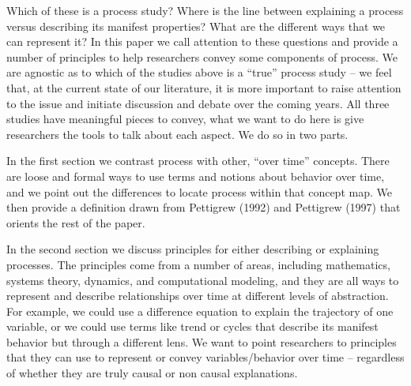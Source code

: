 \documentclass[english,,man]{apa6}
\theoremstyle{definition}
\theoremstyle{definition}
\theoremstyle{definition}
\theoremstyle{remark}
\begin{document}
Which of these is a process study? Where is the line between explaining
a process versus describing its manifest properties? What are the
different ways that we can represent it? In this paper we call attention
to these questions and provide a number of principles to help
researchers convey some components of process. We are agnostic as to
which of the studies above is a \enquote{true} process study -- we feel
that, at the current state of our literature, it is more important to
raise attention to the issue and initiate discussion and debate over the
coming years. All three studies have meaningful pieces to convey, what
we want to do here is give researchers the tools to talk about each
aspect. We do so in two parts.

In the first section we contrast process with other, \enquote{over time}
concepts. There are loose and formal ways to use terms and notions about
behavior over time, and we point out the differences to locate process
within that concept map. We then provide a definition drawn from
Pettigrew (1992) and Pettigrew (1997) that orients the rest of the
paper.

In the second section we discuss principles for either describing or
explaining processes. The principles come from a number of areas,
including mathematics, systems theory, dynamics, and computational
modeling, and they are all ways to represent and describe relationships
over time at different levels of abstraction. For example, we could use
a difference equation to explain the trajectory of one variable, or we
could use terms like trend or cycles that describe its manifest behavior
but through a different lens. We want to point researchers to principles
that they can use to represent or convey variables/behavior over time --
regardless of whether they are truly causal or non causal explanations.
\end{document}
